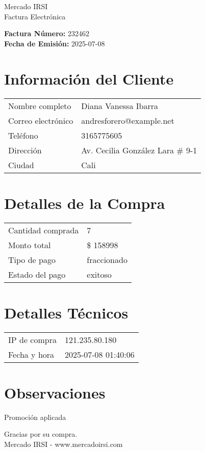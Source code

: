 \documentclass[12pt]{article}
\begin{document}
\begin{center}
    \Huge Mercado IRSI \\
    \Large Factura Electrónica
\end{center}

\vspace{0.5cm}

\noindent \textbf{Factura Número:} 232462 \\
\textbf{Fecha de Emisión:} 2025-07-08

\vspace{0.5cm}

\section*{Información del Cliente}
\begin{longtable}{ll}
Nombre completo & Diana Vanessa Ibarra \\
Correo electrónico & andresforero@example.net \\
Teléfono & 3165775605 \\
Dirección & Av. Cecilia González Lara \# 9-1 \\
Ciudad & Cali \\
\end{longtable}

\vspace{0.5cm}

\section*{Detalles de la Compra}
\begin{longtable}{ll}
Cantidad comprada & 7 \\
Monto total & \$ 158998 \\
Tipo de pago & fraccionado \\
Estado del pago & exitoso \\
\end{longtable}

\vspace{0.5cm}

\section*{Detalles Técnicos}
\begin{longtable}{ll}
IP de compra & 121.235.80.180 \\
Fecha y hora & 2025-07-08 01:40:06 \\
\end{longtable}

\vspace{0.5cm}

\section*{Observaciones}
Promoción aplicada

\vspace{0.5cm}

\begin{center}
    Gracias por su compra. \\
    Mercado IRSI - www.mercadoirsi.com
\end{center}
\end{document}
